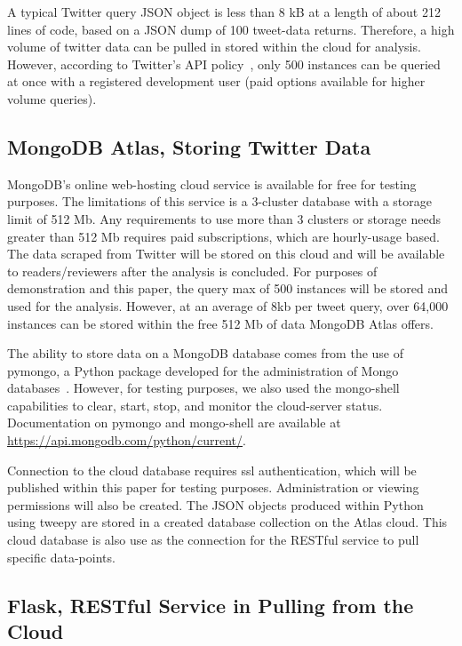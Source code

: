 A typical Twitter query JSON object is less than 8 kB at a length of about 212
lines of code, based on a JSON dump of 100 tweet-data returns. Therefore, a
high volume of twitter data can be pulled in stored within the cloud for
analysis.  However, according to Twitter's API
policy~\cite{TwitterRateLimiting}, only 500 instances can be queried at once
with a registered development user (paid options available for higher volume
queries).

\subsection{MongoDB Atlas, Storing Twitter Data}

MongoDB's online web-hosting cloud service is available for free for testing
purposes. The limitations of this service is a 3-cluster database with a
storage limit of 512 Mb. Any requirements to use more than 3 clusters or
storage needs greater than 512 Mb requires paid subscriptions, which are
hourly-usage based.  The data scraped from Twitter will be stored on this cloud
and will be available to readers/reviewers after the analysis is concluded. For
purposes of demonstration and this paper, the query max of 500 instances will
be stored and used for the analysis. However, at an average of 8kb per tweet
query, over 64,000 instances can be stored within the free 512 Mb of data
MongoDB Atlas offers.

The ability to store data on a MongoDB database comes from the use of pymongo,
a Python package developed for the administration of Mongo
databases~\cite{PyMongoPython}. However, for testing purposes, we also used the
mongo-shell capabilities to clear, start, stop, and monitor the cloud-server
status. Documentation on pymongo and mongo-shell are available at
\url{https://api.mongodb.com/python/current/}.

Connection to the cloud database requires ssl authentication, which will be
published within this paper for testing purposes. Administration or viewing
permissions will also be created. The JSON objects produced within Python using
tweepy are stored in a created database collection on the Atlas cloud. This
cloud database is also use as the connection for the RESTful service to pull
specific data-points.

\subsection{Flask, RESTful Service in Pulling from the Cloud}

